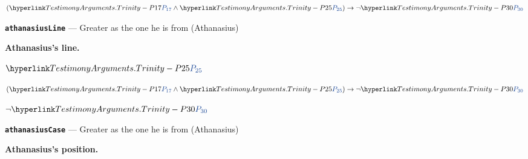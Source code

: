 \documentclass[11pt,paper=\testimonypaper,DIV=13,parskip=false]{scrartcl}
\begin{document}
\begin{derivation}
  \item[] \((\pvar{TestimonyArguments.Trinity}{17} \land \pvar{TestimonyArguments.Trinity}{25}) \rightarrow \lnot \pvar{TestimonyArguments.Trinity}{30}\)
\end{derivation}
\par\medskip\noindent\textbf{\texttt{athanasius\allowbreak{}Line}} --- Greater as the one he is from (Athanasius)\par\nobreak\noindent
\textbf{Athanasius’s line.}

\begin{derivation}
  \item[(1)] \(\pvar{TestimonyArguments.Trinity}{25}\)
  \item[(2)] \((\pvar{TestimonyArguments.Trinity}{17} \land \pvar{TestimonyArguments.Trinity}{25}) \rightarrow \lnot \pvar{TestimonyArguments.Trinity}{30}\)
  \item[\(\vdash\)] \(\lnot \pvar{TestimonyArguments.Trinity}{30}\)
\end{derivation}
\par\medskip\noindent\textbf{\texttt{athanasius\allowbreak{}Case}} --- Greater as the one he is from (Athanasius)\par\nobreak\noindent
\textbf{Athanasius’s position.}
\end{document}
